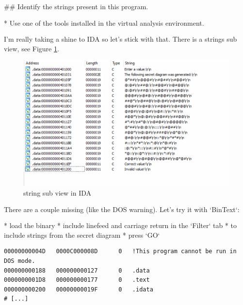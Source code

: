 \begin{markdown}
\clearpage
## Identify the strings present in this program.

* Use one of the tools installed in the virtual analysis environment.

\noindent\s I'm really taking a shine to IDA so let's stick with that. There is a strings sub view, see Figure \ref{strings}.

\begin{figure}[!htbp]
\centering
\includegraphics[width=\linewidth]{media/strings.png}
\caption{string sub view in IDA}\label{strings}
\end{figure}

There are a couple missing (like the DOS warning). Let's try it with `BinText`:\s

* load the binary
* include linefeed and carriage return in the `Filter` tab
    * to include strings from the secret diagram
* press `GO`

\end{markdown}
\begin{lstlisting}[name={more strings}]
00000000004D   0000C000008D      0   !This program cannot be run in DOS mode.
000000000188   000000000127      0   .data
0000000001D8   000000000177      0   .text
000000000200   00000000019F      0   .idata
# [...]
\end{lstlisting}
